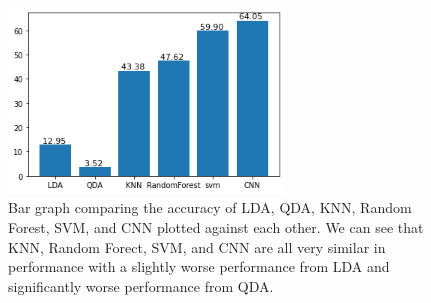\documentclass{article}
\begin{document}
\begin{multicols}{2}

\end{multicols}

\begin{figure}
  \centering
  \includegraphics[width=0.65\textwidth]{CharsPlot1.png}
  \caption{Bar graph comparing the accuracy of LDA, QDA, KNN, Random Forest, SVM, and CNN plotted against each other. We can see that KNN, Random Forect, SVM, and CNN are all very similar in performance with a slightly worse performance from LDA and significantly worse performance from QDA.}
  \label{fig:CharsPlot1}
\end{figure}

\begin{multicols}{2}

\end{multicols}
\end{document}
